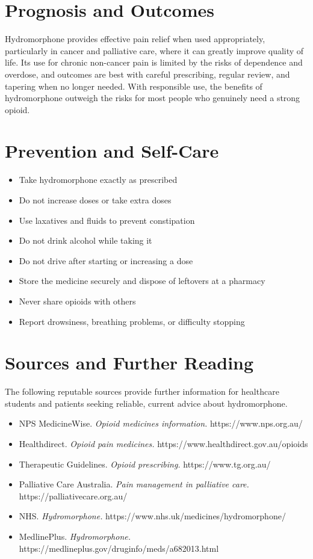 \section*{Prognosis and Outcomes}
Hydromorphone provides effective pain relief when used appropriately, particularly in cancer and palliative care, where it can greatly improve quality of life. Its use for chronic non-cancer pain is limited by the risks of dependence and overdose, and outcomes are best with careful prescribing, regular review, and tapering when no longer needed. With responsible use, the benefits of hydromorphone outweigh the risks for most people who genuinely need a strong opioid.

\section*{Prevention and Self-Care}
\begin{itemize}
    \item Take hydromorphone exactly as prescribed
    \item Do not increase doses or take extra doses
    \item Use laxatives and fluids to prevent constipation
    \item Do not drink alcohol while taking it
    \item Do not drive after starting or increasing a dose
    \item Store the medicine securely and dispose of leftovers at a pharmacy
    \item Never share opioids with others
    \item Report drowsiness, breathing problems, or difficulty stopping
\end{itemize}

\section*{Sources and Further Reading}
The following reputable sources provide further information for healthcare students and patients seeking reliable, current advice about hydromorphone.

\begin{itemize}
    \item NPS MedicineWise. \textit{Opioid medicines information.} https://www.nps.org.au/
    \item Healthdirect. \textit{Opioid pain medicines.} https://www.healthdirect.gov.au/opioids
    \item Therapeutic Guidelines. \textit{Opioid prescribing.} https://www.tg.org.au/
    \item Palliative Care Australia. \textit{Pain management in palliative care.} https://palliativecare.org.au/
    \item NHS. \textit{Hydromorphone.} https://www.nhs.uk/medicines/hydromorphone/
    \item MedlinePlus. \textit{Hydromorphone.} https://medlineplus.gov/druginfo/meds/a682013.html
\end{itemize}
